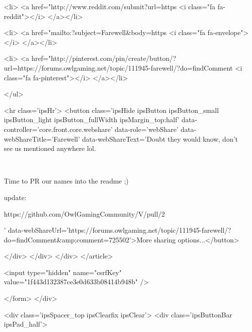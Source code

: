 			<li>
<a href="http://www.reddit.com/submit?url=https%
	<i class="fa fa-reddit"></i>
</a></li>
		
			<li>
<a href="mailto:?subject=Farewell&body=https%
	<i class="fa fa-envelope"></i>
</a></li>
		
			<li>
<a href="http://pinterest.com/pin/create/button/?url=https://forums.owlgaming.net/topic/111945-farewell/?do=findComment%
	<i class="fa fa-pinterest"></i>
</a></li>
		
	</ul>


	<hr class='ipsHr'>
	<button class='ipsHide ipsButton ipsButton_small ipsButton_light ipsButton_fullWidth ipsMargin_top:half' data-controller='core.front.core.webshare' data-role='webShare' data-webShareTitle='Farewell' data-webShareText='Doubt they would know, don’t see us mentioned anywhere lol.
 


	 
 


	Time to PR our names into the readme ;)
 


	update:
 


	https://github.com/OwlGamingCommunity/V/pull/2
 
' data-webShareUrl='https://forums.owlgaming.net/topic/111945-farewell/?do=findComment&amp;comment=725502'>More sharing options...</button>

	
</div>
</div>
	</div>
</article>
					
				
			
			
<input type="hidden" name="csrfKey" value="1f443d132387ce3e0d633b08414b948b" />


		</form>
	</div>

	
	
		<div class='ipsSpacer_top ipsClearfix ipsClear'>
			<div class='ipsButtonBar ipsPad_half'>


